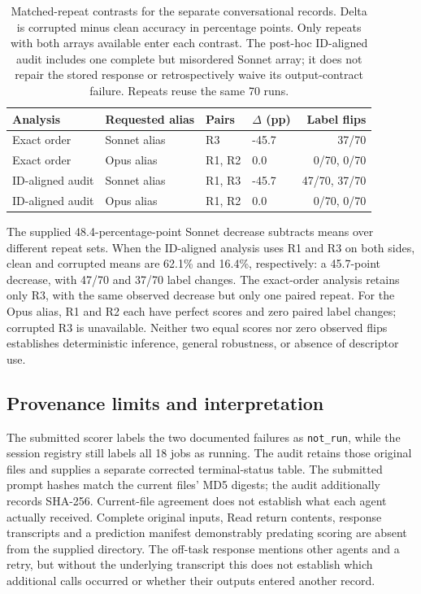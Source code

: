 \documentclass[11pt,a4paper]{article}
\begin{document}
\begin{table}[htbp]
\centering
\small
\caption{Matched-repeat contrasts for the separate conversational records. Delta is corrupted minus clean accuracy in percentage points. Only repeats with both arrays available enter each contrast. The post-hoc ID-aligned audit includes one complete but misordered Sonnet array; it does not repair the stored response or retrospectively waive its output-contract failure. Repeats reuse the same 70 runs.}
\label{tab:claude_conversation_pairs}
\begin{tabular}{@{}llllr@{}}
\toprule
Analysis & Requested alias & Pairs & $\Delta$ (pp) & Label flips \\
\midrule
Exact order & Sonnet alias & R3 & -45.7 & 37/70 \\
Exact order & Opus alias & R1, R2 & 0.0 & 0/70, 0/70 \\
ID-aligned audit & Sonnet alias & R1, R3 & -45.7 & 47/70, 37/70 \\
ID-aligned audit & Opus alias & R1, R2 & 0.0 & 0/70, 0/70 \\
\bottomrule
\end{tabular}
\end{table}


The supplied 48.4-percentage-point Sonnet decrease subtracts means over different repeat sets. When the ID-aligned analysis uses R1 and R3 on both sides, clean and corrupted means are 62.1\% and 16.4\%, respectively: a 45.7-point decrease, with 47/70 and 37/70 label changes. The exact-order analysis retains only R3, with the same observed decrease but only one paired repeat. For the Opus alias, R1 and R2 each have perfect scores and zero paired label changes; corrupted R3 is unavailable. Neither two equal scores nor zero observed flips establishes deterministic inference, general robustness, or absence of descriptor use.

\subsection{Provenance limits and interpretation}
The submitted scorer labels the two documented failures as \texttt{not\_run}, while the session registry still labels all 18 jobs as running. The audit retains those original files and supplies a separate corrected terminal-status table. The submitted prompt hashes match the current files' MD5 digests; the audit additionally records SHA-256. Current-file agreement does not establish what each agent actually received. Complete original inputs, Read return contents, response transcripts and a prediction manifest demonstrably predating scoring are absent from the supplied directory. The off-task response mentions other agents and a retry, but without the underlying transcript this does not establish which additional calls occurred or whether their outputs entered another record.
\end{document}

